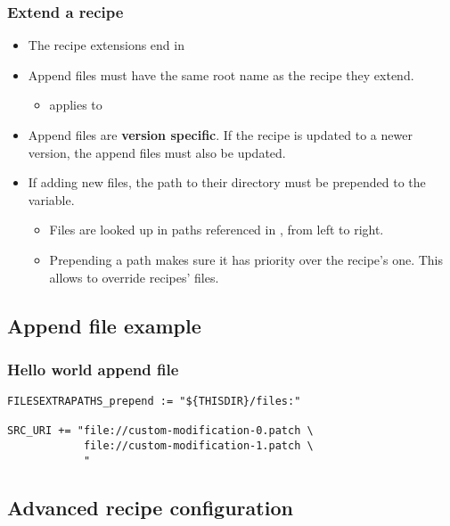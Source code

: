 \begin{frame}
  \frametitle{Extend a recipe}
  \begin{itemize}
    \item The recipe extensions end in 
    \item Append files must have the same root name as the recipe they
          extend.
    \begin{itemize}
      \item {} applies to
    \end{itemize}
    \item Append files are {\bf version specific}. If the recipe is
          updated to a newer version, the append files must also be
          updated.
    \item If adding new files, the path to their directory must
          be prepended to the  variable.
    \begin{itemize}
      \item Files are looked up in paths referenced in
            , from left to right.
      \item Prepending a path makes sure it has priority over the recipe's
            one. This allows to override recipes' files.
    \end{itemize}
  \end{itemize}
\end{frame}

\subsection{Append file example}

\begin{frame}[fragile]
  \frametitle{Hello world append file}
  \begin{block}{}
    \begin{verbatim}
FILESEXTRAPATHS_prepend := "${THISDIR}/files:"

SRC_URI += "file://custom-modification-0.patch \
            file://custom-modification-1.patch \
            "
    \end{verbatim}
  \end{block}
\end{frame}

\subsection{Advanced recipe configuration}

